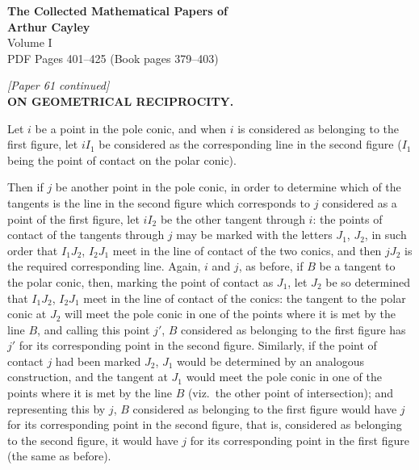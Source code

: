 \documentclass[11pt]{article}
\begin{document}
\begin{center}
{\LARGE\bfseries The Collected Mathematical Papers of}\\[0.5em]
{\LARGE\bfseries Arthur Cayley}\\[1em]
{\Large Volume I}\\[1em]
{\large PDF Pages 401--425 \quad (Book pages 379--403)}\\[2em]
\end{center}

\bigskip

\begin{center}
\textit{[Paper 61 continued]}\\[0.5em]
\textbf{\large ON GEOMETRICAL RECIPROCITY.}
\end{center}

\medskip

Let $i$ be a point in the pole conic, and when $i$ is considered as belonging to
the first figure, let $iI_{1}$ be considered as the corresponding line in the second figure
($I_{1}$ being the point of contact on the polar conic).

Then if $j$ be another point in the pole conic, in order to determine which of
the tangents is the line in the second figure which corresponds to $j$ considered as a
point of the first figure, let $iI_{2}$ be the other tangent through $i$: the points of contact
of the tangents through $j$ may be marked with the letters $J_{1}$, $J_{2}$, in such order that
$I_{1}J_{2}$, $I_{2}J_{1}$ meet in the line of contact of the two conics, and then $jJ_{2}$ is the required
corresponding line. Again, $i$ and $j$, as before, if $B$ be a tangent to the polar conic,
then, marking the point of contact as $J_{1}$, let $J_{2}$ be so determined that $I_{1}J_{2}$, $I_{2}J_{1}$
meet in the line of contact of the conics: the tangent to the polar conic at $J_{2}$ will
meet the pole conic in one of the points where it is met by the line $B$, and calling
this point $j'$, $B$ considered as belonging to the first figure has $j'$ for its
corresponding point in the second figure. Similarly, if the point of contact $j$ had been
marked $J_{2}$, $J_{1}$ would be determined by an analogous construction, and the tangent at
$J_{1}$ would meet the pole conic in one of the points where it is met by the line $B$
(viz.\ the other point of intersection); and representing this by $j$, $B$ considered as
belonging to the first figure would have $j$ for its corresponding point in the second
figure, that is, considered as belonging to the second figure, it would have $j$ for its
corresponding point in the first figure (the same as before).
\end{document}
